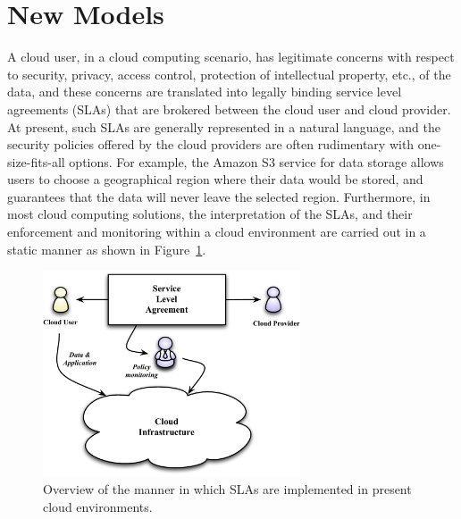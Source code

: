 \documentclass[times, 10pt,twocolumn]{article}
\begin{document}
\section{New Models}
A cloud user, in a cloud computing scenario, has legitimate concerns with respect to security, privacy, access control, protection of intellectual property, etc., of the data, and these concerns are translated into legally binding service level agreements (SLAs) that are brokered between the cloud user and cloud provider. At present, such SLAs are generally represented in a natural language, and the security policies offered by the cloud providers are often rudimentary with one-size-fits-all options. For example, the Amazon S3 service for data storage allows users to choose a geographical region where their data would be stored, and guarantees that the data will never leave the selected region. Furthermore, in most cloud computing solutions, the interpretation of the SLAs, and their enforcement and monitoring within a cloud environment are carried out in a static manner as shown in Figure~\ref{fig:overview}.

\begin{figure}[!t]
\centering
\includegraphics[width=3in]{Overview.pdf}
\caption{Overview of the manner in which SLAs are implemented in present cloud environments.}
\label{fig:overview}
\end{figure}
\end{document}
